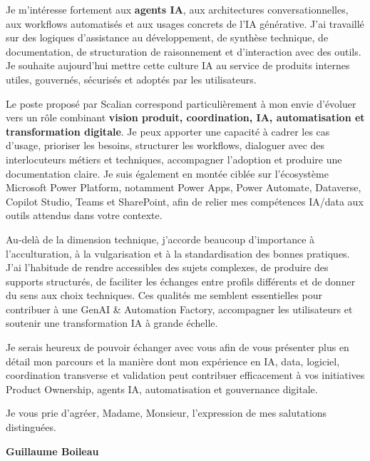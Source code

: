 \documentclass[11pt,a4paper]{altacv}
\begin{document}
{Je m'intéresse fortement aux \textbf{agents IA}, aux architectures conversationnelles, aux workflows automatisés et aux usages concrets de l'IA générative. J'ai travaillé sur des logiques d'assistance au développement, de synthèse technique, de documentation, de structuration de raisonnement et d'interaction avec des outils. Je souhaite aujourd'hui mettre cette culture IA au service de produits internes utiles, gouvernés, sécurisés et adoptés par les utilisateurs.

Le poste proposé par Scalian correspond particulièrement à mon envie d'évoluer vers un rôle combinant \textbf{vision produit, coordination, IA, automatisation et transformation digitale}. Je peux apporter une capacité à cadrer les cas d'usage, prioriser les besoins, structurer les workflows, dialoguer avec des interlocuteurs métiers et techniques, accompagner l'adoption et produire une documentation claire. Je suis également en montée ciblée sur l'écosystème Microsoft Power Platform, notamment Power Apps, Power Automate, Dataverse, Copilot Studio, Teams et SharePoint, afin de relier mes compétences IA/data aux outils attendus dans votre contexte.

Au-delà de la dimension technique, j'accorde beaucoup d'importance à l'acculturation, à la vulgarisation et à la standardisation des bonnes pratiques. J'ai l'habitude de rendre accessibles des sujets complexes, de produire des supports structurés, de faciliter les échanges entre profils différents et de donner du sens aux choix techniques. Ces qualités me semblent essentielles pour contribuer à une GenAI \& Automation Factory, accompagner les utilisateurs et soutenir une transformation IA à grande échelle.

Je serais heureux de pouvoir échanger avec vous afin de vous présenter plus en détail mon parcours et la manière dont mon expérience en IA, data, logiciel, coordination transverse et validation peut contribuer efficacement à vos initiatives Product Ownership, agents IA, automatisation et gouvernance digitale.

Je vous prie d'agréer, Madame, Monsieur, l'expression de mes salutations distinguées.

\textbf{Guillaume Boileau}

}
\end{document}
